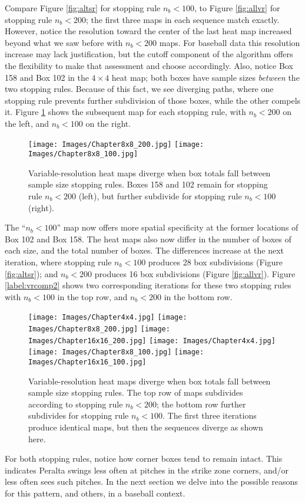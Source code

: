 Compare Figure \ref{fig:altsr} for stopping rule $n_{b} < 100$, to Figure \ref{fig:allvr} for stopping rule $n_{b} < 200$; the first three maps in each sequence match exactly. However, notice the resolution toward the center of the last heat map increased beyond what we saw before with $n_{b} < 200$ maps. For baseball data this resolution increase may lack justification, but the cutoff component of the algorithm offers the flexibility to make that assessment and choose accordingly. Also, notice Box 158 and Box 102 in the $4 \times 4$ heat map; both boxes have sample sizes {\it between} the two stopping rules. Because of this fact, we see diverging paths, where one stopping rule prevents further subdivision of those boxes, while the other compels it. Figure \ref{fig:vrcomp} shows the subsequent map for each stopping rule, with $n_{b} < 200$ on the left, and $n_{b} < 100$ on the right.
        \begin{figure}[H]
      	\centering      
      	\texttt{[image: Images/Chapter8x8\_200.jpg]}
      	\texttt{[image: Images/Chapter8x8\_100.jpg]}
      	\caption{Variable-resolution heat maps diverge when box totals fall between sample size stopping rules. Boxes 158 and 102 remain for stopping rule $n_{b} < 200$ (left), but further subdivide for stopping rule $n_{b} < 100$ (right).}
      	\label{fig:vrcomp}
\end{figure} 
The ``$n_{b} < 100$'' map now offers more spatial specificity at the former locations of Box 102 and Box 158. The heat maps also now differ in the number of boxes of each size, and the total number of boxes.  The differences increase at the next iteration, where stopping rule $n_{b} < 100$ produces 28 box subdivisions (Figure \ref{fig:altsr}); and $n_{b} < 200$ produces 16 box subdivisions (Figure \ref{fig:allvr}). Figure \ref{label:vrcomp2} shows two corresponding iterations for these two stopping rules with $n_{b} < 100$ in the top row, and $n_{b} < 200$ in the bottom row.
        \begin{figure}[H]
      	\centering      
      	\texttt{[image: Images/Chapter4x4.jpg]}
      	\texttt{[image: Images/Chapter8x8\_200.jpg]}
      	\texttt{[image: Images/Chapter16x16\_200.jpg]}
      	\texttt{[image: Images/Chapter4x4.jpg]}
      	\texttt{[image: Images/Chapter8x8\_100.jpg]}
      	\texttt{[image: Images/Chapter16x16\_100.jpg]}
      	\caption{Variable-resolution heat maps diverge when box totals fall between sample size stopping rules. The top row of maps subdivides according to stopping rule $n_{b} < 200$; the bottom row further subdivides for stopping rule $n_{b} < 100$. The first three iterations produce identical maps, but then the sequences diverge as shown here.}
      	\label{fig:vrcomp2}
\end{figure}
For both stopping rules, notice how corner boxes tend to remain intact. This indicates Peralta swings less often at pitches in the strike zone corners, and/or less often sees such pitches. In the next section we delve into the possible reasons for this pattern, and others, in a baseball context.

